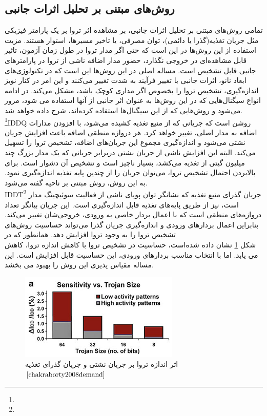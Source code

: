 \subsection{روش‌های مبتنی بر تحلیل اثرات جانبی}
تمامی روش‌های مبتنی بر تحلیل اثرات جانبی، بر مشاهده اثر تروا بر یک پارامتر فیزیکی مثل جریان تغذیه(گذرا یا دائمی)، توان مصرفی، یا تاخیر مسیرها، استوار هستند. مزیت استفاده از این روش‌ها در این است که حتی اگر مدار تروا در طول زمان آزمون، تاثیر قابل مشاهده‌ای در خروجی نگذارد، حضور مدار اضافه ناشی از تروا در پارامترهای جانبی قابل تشخیص است. مساله اصلی در این روش‌ها این است که در تکنولوژی‌های ابعاد نانو، اثرات جانبی با تغییر فرآیند به شدت تغییر می‌کنند و این امر در کنار نویز اندازه‌گیری، تشخیص تروا را بخصوص اگر مداری کوچک باشد، مشکل می‌کند. در ادامه انواع سیگنال‌هایی که در این روش‌ها به عنوان اثر جانبی از آنها استفاده می شود، مرور می‌شود و روش‌هایی که از این سیگنال‌ها استفاده کرده‌اند، شرح داده خواهد شد.
\\
\footnote{}IDDQ روشن است که جریانی که از منبع تغذیه کشیده می‌شود، با افزودن مدارات اضافه به مدار اصلی، تغییر خواهد کرد. هر دروازه منطقی اضافه باعث افزایش جریان نشتی می‌شود و اندازه‌گیری مجموع این جریان‌های اضافه، تشخیص تروا را تسهیل می‌کند. البته این افزایش ناشی از جریان نشتی دربرابر جریانی که یک مدار بزرگ چند میلیون گیتی از تغذیه می‌کشد، بسیار ناچیز است و تشخیص آن دشوار است. برای بالابردن احتمال تشخیص تروا، می‌توان جریان را از چندین پایه تغذیه اندازه‌گیری نمود. به این روش، روش مبتنی بر ناحیه گفته می‌شود.
\\
IDDT\footnote{}
جریان گذرای منبع تغذیه که نشانگر توان پویای ناشی از فعالیت سوئیچینگ مدار است، نیز از طریق پایه‌های تغذیه قابل
اندازه‌گیری است. این جریان بیانگر تعداد دروازه‌های منطقی است که با اعمال بردار خاصی به ورودی، خروجی‌شان تغییر می‌کند. بنابراین اعمال بردارهای ورودی و اندازه‌گیری جریان گذرا می‌تواند حساسیت روش‌های تشخیص تروا را به وجود تروا افزایش دهد. همانطور که در\\
شکل
\ref{fig4-4}
نشان داده شده‌است، حساسیت در تشخیص تروا با کاهش اندازه تروا، کاهش می یابد. اما با انتخاب مناسب بردارهای ورودی، این حساسیت قابل افزایش است. این مساله مقیاس پذیری این روش را بهبود می بخشد.
\begin{figure}
	\begin{center}
		\includegraphics[scale=1]{figs/fig4-4.png}
		\caption[اثر اندازه تروا بر جریان نشتی و جریان گذرای تغذیه]
		{اثر اندازه تروا بر جریان نشتی و جریان گذرای تغذیه $\cite{chakraborty2008demand}$}
		\label{fig4-4}
	\end{center}
\end{figure} 
